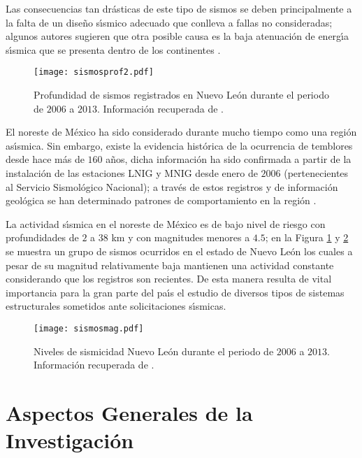 Las consecuencias tan dr\'asticas de este tipo de sismos se deben principalmente a la falta de un dise\~no s\'{\i}smico adecuado que conlleva a fallas no consideradas; algunos autores sugieren que otra posible causa es la baja atenuaci\'on de energ\'{\i}a s\'{\i}smica que se presenta dentro de los continentes \cite{MA2009}.

\begin{figure}[htbp]
	\centering
		\texttt{[image: sismosprof2.pdf]}
	\caption{Profundidad de sismos registrados en Nuevo Le\'on durante el periodo de $2006$ a $2013$. Informaci\'on recuperada de \cite{USGS2013}.}
	\label{figsis:fig2}
\end{figure}

El noreste de M\'exico ha sido considerado durante mucho tiempo como una regi\'on as\'{\i}smica. Sin embargo, existe la evidencia hist\'orica de la ocurrencia de temblores desde hace m\'as de $160$ a\~nos, dicha informaci\'on ha sido confirmada a  partir de la instalaci\'on de las estaciones LNIG y MNIG desde enero de $2006$ (pertenecientes al Servicio Sismol\'ogico Nacional); a trav\'es de estos registros y de informaci\'on geol\'ogica se han determinado patrones de comportamiento en la regi\'on \cite{LHJ2012}.

La actividad s\'{\i}smica en el noreste de M\'exico es de bajo nivel de riesgo con profundidades de $2$ a $38$ km y con magnitudes menores a $4.5$; en la Figura \ref{figsis:fig2} y \ref{figsis:fig3} se muestra un grupo de sismos ocurridos en el estado de Nuevo Le\'on los cuales a pesar de su magnitud relativamente baja mantienen una actividad constante considerando que los registros son recientes. De esta manera resulta de vital importancia para la gran parte del pa\'{\i}s el estudio de diversos tipos de sistemas estructurales sometidos ante solicitaciones s\'{\i}smicas.

\begin{figure}[htbp]
	\centering
		\texttt{[image: sismosmag.pdf]}
	\caption{Niveles de sismicidad Nuevo Le\'on durante el periodo de $2006$ a $2013$. Informaci\'on recuperada de \cite{USGS2013}.}
	\label{figsis:fig3}
\end{figure}

\newpage

\section{Aspectos Generales de la Investigaci\'on}


